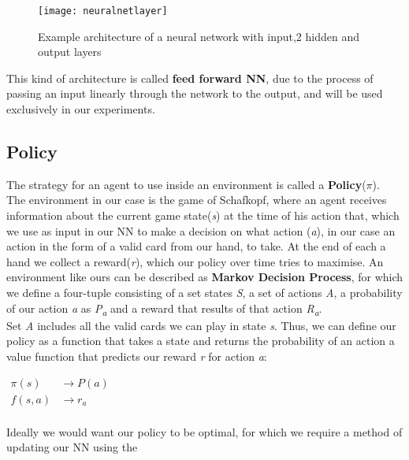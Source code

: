 \begin{figure}[h!]
    \centering
    \texttt{[image: neuralnetlayer]}
    \caption{Example architecture of a neural network with input,2 hidden and output layers}
    \label{fig:architecture}
\end{figure}
This kind of architecture is called \textbf{feed forward NN}, due to the process of passing an input linearly through
the network to the output, and will be used exclusively in our experiments.\\

\subsection{Policy}
The strategy for an agent to use inside an environment is called a \textbf{Policy}($\pi$).\\
The environment in our case is the game of Schafkopf, where an agent receives information about the current game
state(\textit{s}) at the time of his action that, which we use as input in our NN to make a decision on what action
(\textit{a}), in our case an action in the form of a valid card from our hand, to take.
At the end of each a hand we collect a reward(\textit{r}), which our policy over time tries to maximise.
\newline
An environment like ours can be described as \textbf{Markov Decision Process}, for which we define a four-tuple
consisting of a set states \textit{S}, a set of actions \textit{A}, a probability of our action \textit{a} as
\textit{P\textsubscript{a}} and a reward that results of that action \textit{R\textsubscript{a}}.\\
Set \textit{A} includes all the valid cards we can play in state \textit{s}.
Thus, we can define our policy as a function that takes a state and returns the probability of an action a value
function that predicts our reward \textit{r} for action \textit{a}:
\begin{center}
    \begin{math}
        \boxed{
            \begin{aligned}
                \pi(s)&\rightarrow P(a)\\
                f(s,a)&\rightarrow r_{a}\\
            \end{aligned}}
    \end{math}
\end{center}
Ideally we would want our policy to be optimal, for which we require a method of updating our NN using the
